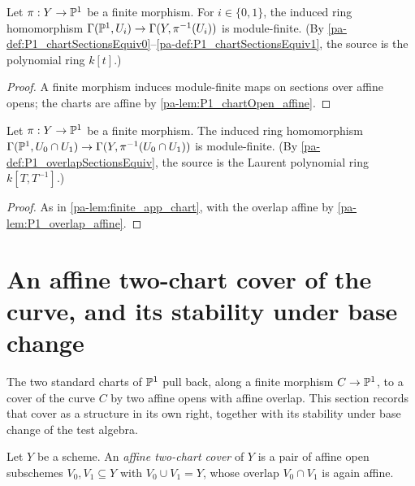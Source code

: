 \begin{lemma}
  \label{pa-lem:finite_app_chart}
  \leanok

  Let \(\pi : Y \to \mathbb{P}^1\) be a finite morphism. For \(i \in \{0,1\}\), the induced ring
  homomorphism \(\Gamma(\mathbb{P}^1, U_i) \to \Gamma(Y, \pi^{-1}(U_i))\) is module-finite. (By
  \ref{pa-def:P1_chartSectionsEquiv0}--\ref{pa-def:P1_chartSectionsEquiv1}, the source is the
  polynomial ring \(k[t]\).)
\end{lemma}
\begin{proof}
  \leanok
  A finite morphism induces module-finite maps on sections over affine opens; the charts are
  affine by \ref{pa-lem:P1_chartOpen_affine}.
\end{proof}

\begin{lemma}
  \label{pa-lem:finite_app_overlap}
  \leanok

  Let \(\pi : Y \to \mathbb{P}^1\) be a finite morphism. The induced ring homomorphism
  \(\Gamma(\mathbb{P}^1, U_0 \cap U_1) \to \Gamma(Y, \pi^{-1}(U_0 \cap U_1))\) is module-finite.
  (By \ref{pa-def:P1_overlapSectionsEquiv}, the source is the Laurent polynomial ring
  \(k[T,T^{-1}]\).)
\end{lemma}
\begin{proof}
  \leanok
  As in \ref{pa-lem:finite_app_chart}, with the overlap affine by \ref{pa-lem:P1_overlap_affine}.
\end{proof}

\section{An affine two-chart cover of the curve, and its stability under base change}

The two standard charts of \(\mathbb{P}^1\) pull back, along a finite morphism \(C \to \mathbb{P}^1\), to a
cover of the curve \(C\) by two affine opens with affine overlap. This section records that
cover as a structure in its own right, together with its stability under base change of the
test algebra.

\begin{definition}
  \label{pa-def:AffineTwoCover}
  \leanok

  Let \(Y\) be a scheme. An \emph{affine two-chart cover} of \(Y\) is a pair of affine open
  subschemes \(V_0, V_1 \subseteq Y\) with \(V_0 \cup V_1 = Y\), whose overlap \(V_0 \cap V_1\)
  is again affine.
\end{definition}

